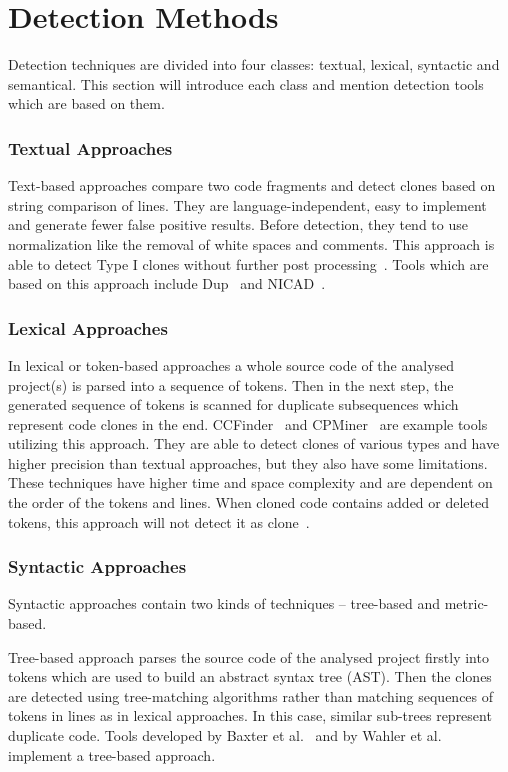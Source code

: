 \section{Detection Methods}
  Detection techniques are divided into four classes: textual, lexical, syntactic and semantical.
  This section will introduce each class and mention detection tools which are based on them.

  \subsubsection*{Textual Approaches}\label{clone-detection:simian}
    Text-based approaches compare two code fragments and detect clones based on string comparison of lines.
    They are language-independent, easy to implement and generate fewer false positive results. Before detection,
    they tend to use normalization like the removal of white spaces and comments. This approach is able to detect
    Type I clones without further post processing~\cite{CloneDetectionTechniques, CodeClonesSurvey}. Tools which
    are based on this approach include Dup~\cite{Dup} and NICAD~\cite{NICAD}.

  \subsubsection*{Lexical Approaches}
    In lexical or token-based approaches a whole source code of the analysed project(s) is parsed into a sequence
    of tokens. Then in the next step, the generated sequence of tokens is scanned for duplicate subsequences which
    represent code clones in the end. CCFinder~\cite{CCFinder} and CPMiner~\cite{CPMiner} are example tools
    utilizing this approach. They are able to detect clones of various types and have higher precision than
    textual approaches, but they also have some limitations. These techniques have higher time and space
    complexity and are dependent on the order of the tokens and lines. When cloned code contains added or deleted
    tokens, this approach will not detect it as clone~\cite{CloneDetectionTechniques, CodeClonesSurvey}.

  \subsubsection*{Syntactic Approaches}
    Syntactic approaches contain two kinds of techniques -- tree-based and metric-based.

    Tree-based approach parses the source code of the analysed project firstly into tokens which are used
    to build an abstract syntax tree (AST). Then the clones are detected using tree-matching algorithms rather
    than matching sequences of tokens in lines as in lexical approaches. In this case, similar sub-trees
    represent duplicate code. Tools developed by Baxter et al.~\cite{ASTBaxter} and by Wahler et
    al.~\cite{ASTWahler} implement a tree-based approach.

